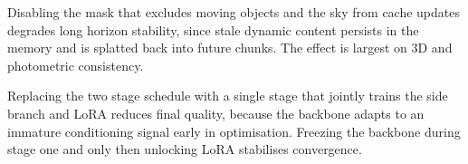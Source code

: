 Disabling the mask that excludes moving objects and the sky from cache updates degrades long horizon stability, since stale dynamic content persists in the memory and is splatted back into future chunks. The effect is largest on 3D and photometric consistency.

Replacing the two stage schedule with a single stage that jointly trains the side branch and LoRA reduces final quality, because the backbone adapts to an immature conditioning signal early in optimisation. Freezing the backbone during stage one and only then unlocking LoRA stabilises convergence.
\begin{table}
    \centering
    \caption{\textbf{Ablation studies on a WorldScore split.} Each row disables or alters a single component of \method{} while all other settings remain fixed.}
    \label{tab:ablation}
\end{table}



